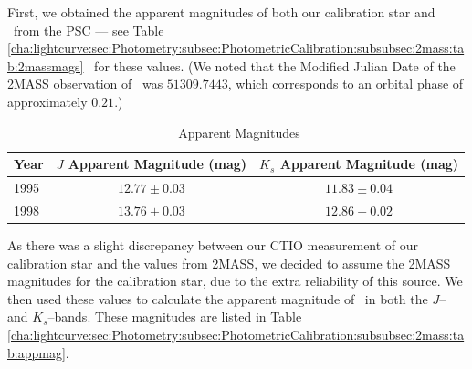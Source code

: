 First, we obtained the apparent magnitudes of both our calibration star and \groj\ from the PSC --- see Table~%
\vref{cha:lightcurve:sec:Photometry:subsec:PhotometricCalibration:subsubsec:2mass:tab:2massmags}%
\ for these values. (We noted that the Modified Julian Date of the 2MASS observation of \groj\ was $51309.7443$, which corresponds to an orbital phase of approximately $0.21$.) %

\vspace{\myparskip}

\begin{table}[htb]
\caption{\groj\ Apparent Magnitudes}\label{cha:lightcurve:sec:Photometry:subsec:PhotometricCalibration:subsubsec:2mass:tab:appmag}

\begin{minipage}{\linewidth}
\renewcommand{\thefootnote}{\thempfootnote}

\begin{center}
\begin{tabular}{|l||||c|c|}

\hline
Year & $J$ Apparent Magnitude (mag) & $K_s$ Apparent Magnitude (mag)\\\hline\hline\hline\hline
1995 & $12.77\pm0.03$ & $11.83\pm0.04$ \\\hline
1998 & $13.76\pm0.03$ & $12.86\pm0.02$ \\\hline
\hline
\end{tabular}
\end{center}
\end{minipage}
\end{table}

\vspace{\myparskip}

As there was a slight discrepancy between our CTIO measurement of our calibration star and the values from 2MASS, we decided to assume the 2MASS magnitudes for the calibration star, due to the extra reliability of this source. We then used these values to calculate the apparent magnitude of \groj\ in both the $J$-- and $K_{s}$--bands. These magnitudes are listed in Table~%
\vref{cha:lightcurve:sec:Photometry:subsec:PhotometricCalibration:subsubsec:2mass:tab:appmag}. %

